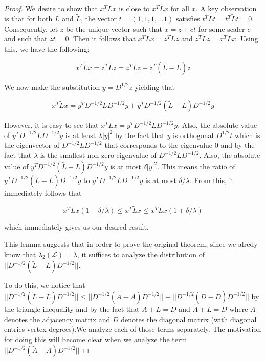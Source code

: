 \documentclass[12pt,twoside]{article}
\begin{document}
\begin{proof}

We desire to show that $x^TLx$ is close to $x^T\tilde{L}x$ for all $x$. A key observation is that for both $L$ and $\tilde{L}$, the vector $t = (1,1,1,...1)$ satisfies $t^TLt = t^T\tilde{L}t = 0$. Consequently, let $z$ be the unique vector such that $x = z + ct$ for some scaler $c$ and such that $z \dot t = 0$. Then it follows that $x^TLx = z^TLz$ and $z^T\tilde{L}z = x^T\tilde{L}x$. Using this, we have the following:

\begin{equation*}
x^T\tilde{L}x = z^T\tilde{L}z = z^TLz + z^T(\tilde{L} - L)z
\end{equation*}

We now make the substitution $y = D^{1/2}z$ yielding that

\begin{equation*}
x^T\tilde{L}x = y^TD^{-1/2}LD^{-1/2}y + y^TD^{-1/2}(\tilde{L} - L)D^{-1/2}y
\end{equation*}

However, it is easy to see that $x^TLx = y^TD^{-1/2}LD^{-1/2}y$. Also, the absolute value of $y^TD^{-1/2}LD^{-1/2}y$ is at least $\lambda|y|^2$ by the fact that $y$ is orthogonal $D^{1/2}t$ which is the eigenvector of $D^{-1/2}LD^{-1/2}$ that corresponds to the eigenvalue 0 and by the fact that $\lambda$ is the smallest non-zero eigenvalue of $D^{-1/2}LD^{-1/2}$. Also, the absolute value of $y^TD^{-1/2}(\tilde{L} - L)D^{-1/2}y$ is at most $\delta|y|^2$. This means the ratio of $y^TD^{-1/2}(\tilde{L} - L)D^{-1/2}y$ to $y^TD^{-1/2}LD^{-1/2}y$ is at most $\delta/\lambda$. From this, it immediately follows that

\begin{equation*}
x^TLx(1 - \delta/\lambda) \leq x^T\tilde{L}x \leq x^TLx(1 + \delta/\lambda)
\end{equation*}

which immediately gives us our desired result. 

This lemma suggests that in order to prove the original theorem, since we alredy know that $\lambda_2(\mathcal{L}) = \lambda$, it suffices to analyze the distribution of $||D^{-1/2}(\tilde{L} - L)D^{-1/2}||$. 

To do this, we notice that $||D^{-1/2}(\tilde{L} - L)D^{-1/2}|| \leq ||D^{-1/2}(\tilde{A} - A)D^{-1/2}|| + ||D^{-1/2}(\tilde{D} - D)D^{-1/2}||$ by the triangle inequality and by the fact that $A + L = D$ and $\tilde{A} + \tilde{L} = \tilde{D}$ where $A$ denotes the adjacency matrix and $D$ denotes the diagonal matrix (with diagonal entries vertex degrees).We analyze each of those terms separately. The motivation for doing this will become clear when we analyze the term $||D^{-1/2}(\tilde{A} - A)D^{-1/2}||$


\end{proof}
\end{document}
